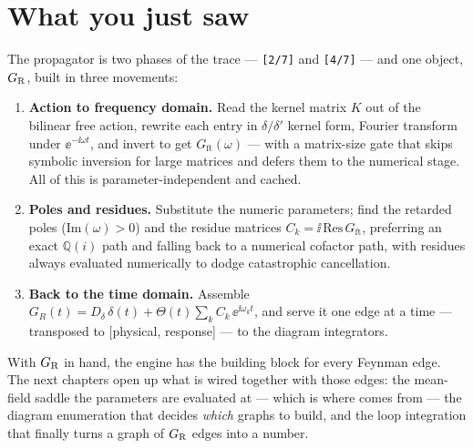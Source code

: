 \section{What you just saw}

The propagator is two phases of the trace --- \texttt{[2/7]} and \texttt{[4/7]}
--- and one object, $G_{\mathrm R}$, built in three movements:

\begin{enumerate}
  \item \textbf{Action to frequency domain.} Read the kernel matrix $K$ out of the
        bilinear free action, rewrite each entry in $\delta/\delta'$ kernel form,
        Fourier transform under $\ee^{-\ii\omega t}$, and invert to get
        $G_{\mathrm{ft}}(\omega)$ --- with a matrix-size gate that skips symbolic
        inversion for large matrices and defers them to the numerical stage. All of
        this is parameter-independent and cached.
  \item \textbf{Poles and residues.} Substitute the numeric parameters; find the
        retarded poles ($\mathrm{Im}(\omega) > 0$) and the residue matrices $C_k =
        \ii\,\mathrm{Res}\,G_{\mathrm{ft}}$, preferring an exact $\mathbb{Q}(i)$
        path and falling back to a numerical cofactor path, with residues always
        evaluated numerically to dodge catastrophic cancellation.
  \item \textbf{Back to the time domain.} Assemble $G_R(t) = D_\delta\,\delta(t) +
        \Theta(t)\sum_k C_k\,\ee^{\ii\omega_k t}$, and serve it one edge at a time
        --- transposed to [physical, response] --- to the diagram integrators.
\end{enumerate}

With $G_{\mathrm R}$ in hand, the engine has the building block for every Feynman edge.
The next chapters open up what is wired together with those edges: the mean-field
saddle the parameters are evaluated at --- which is where  comes
from --- the diagram enumeration that decides \emph{which} graphs to build, and
the loop integration that finally turns a graph of $G_{\mathrm R}$ edges into a number.
